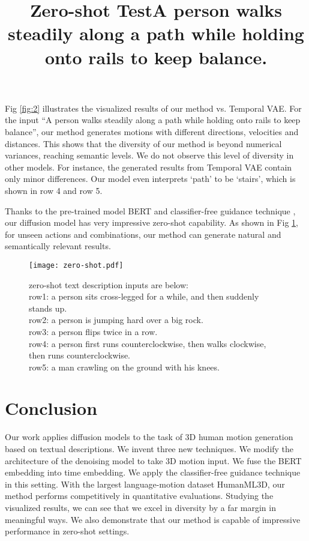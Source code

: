 \documentclass{article}
\begin{document}
Fig \ref{fig:2} illustrates the visualized results of our method vs. Temporal VAE. For the input ``A person walks steadily along a path while holding onto rails to keep balance'', our method generates motions with different directions, velocities and distances. This shows that the diversity of our method is beyond numerical variances, reaching semantic levels. We do not observe this level of diversity in other models. For instance, the generated results from Temporal VAE contain only minor differences. Our model even interprets `path' to be  `stairs', which is shown in row 4 and row 5. 




Thanks to the pre-trained model BERT \cite{devlin2018bert} and classifier-free guidance technique \cite{ho2022classifier}, our diffusion model has very impressive zero-shot capability. As shown in Fig \ref{fig:3}, for unseen actions and combinations, our method can generate natural and semantically relevant results.




\begin{figure}[h]
    \centering
    \title{Zero-shot Test} 
    \texttt{[image: zero-shot.pdf]}
    \title{A person \textbf{walks steadily along a path} while\textbf{ holding onto rails} to keep balance.}
    \caption{zero-shot text description inputs are below:\\
    row1: a person sits cross-legged for a while, and then suddenly stands up.\\
    row2: a person is jumping hard over a big rock.\\
    row3: a person flips twice in a row.\\
    row4: a person first runs counterclockwise, then walks clockwise, then runs counterclockwise.\\
    row5: a man crawling on the ground with his knees.}
    \label{fig:3}
    \vspace{-5mm}
\end{figure}
\section{Conclusion}

Our work applies diffusion models to the task of 3D human motion generation based on textual descriptions. We invent three new techniques. We modify the architecture of the denoising model to take 3D motion input. We fuse the BERT embedding into time embedding. We apply the classifier-free guidance technique in this setting. With the largest language-motion dataset HumanML3D, our method performs competitively in quantitative evaluations. Studying the visualized results, we can see that we excel in diversity by a far margin in meaningful ways. We also demonstrate that our method is capable of impressive performance in  zero-shot settings.



\end{document}
